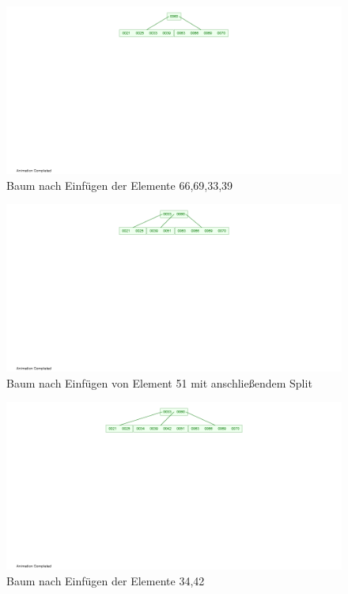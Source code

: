 \documentclass[12pt]{scrartcl}
\begin{document}
\begin{figure}[h!]
\begin{center}
\includegraphics[scale=1]{B-Tree3.png}
\caption{Baum nach Einfügen der Elemente 66,69,33,39}
\end{center}
\end{figure}

\begin{figure}[h!]
\begin{center}
\includegraphics[scale=1]{B-Tree4.png}
\caption{Baum nach Einfügen von Element 51 mit anschließendem Split}
\end{center}
\end{figure}

\begin{figure}[h!]
\begin{center}
\includegraphics[scale=1]{B-Tree5.png}
\caption{Baum nach Einfügen der Elemente 34,42}
\end{center}
\end{figure}
\end{document}
